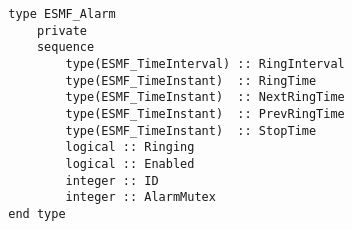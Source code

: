 \begin{verbatim}
        type ESMF_Alarm
            private
            sequence
                type(ESMF_TimeInterval) :: RingInterval
                type(ESMF_TimeInstant)  :: RingTime
                type(ESMF_TimeInstant)  :: NextRingTime
                type(ESMF_TimeInstant)  :: PrevRingTime
                type(ESMF_TimeInstant)  :: StopTime
                logical :: Ringing
                logical :: Enabled
                integer :: ID
                integer :: AlarmMutex
        end type
\end{verbatim}
